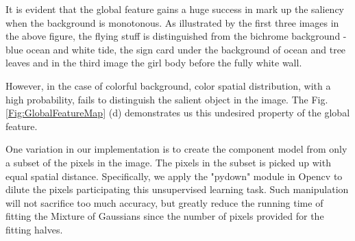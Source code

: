 \documentclass[10pt,twocolumn,letterpaper]{article}
\begin{document}
It is evident that the global feature gains a huge success in mark up the saliency when the background is monotonous. As illustrated by the first three images in the above figure, the flying stuff is distinguished from the bichrome background - blue ocean and white tide, the sign card under the  background of ocean and tree leaves and in the third image the girl body before the fully white wall.

However, in the case of colorful background, color spatial distribution, with a high probability, fails to distinguish the salient object in the image. The Fig.\ref{Fig:GlobalFeatureMap} (d) demonstrates us this undesired property of the global feature. 

One variation in our implementation is to create the component model from only a subset of the pixels in the image. The pixels in the subset is picked up with equal spatial distance. Specifically, we apply the "pydown" module in Opencv to dilute the pixels participating this unsupervised learning task. Such manipulation will not sacrifice too much accuracy, but greatly reduce  the running time of fitting the Mixture of Gaussians since the number of pixels provided for the fitting halves. 
\end{document}
